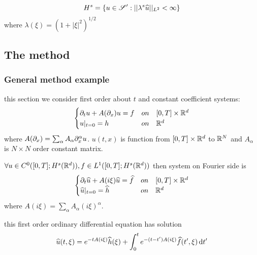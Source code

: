 \documentclass[../main]{subfiles}
\begin{document}
\begin{defn}
    \begin{equation}
        H^s =\{u\in \mathscr{S}': ||\lambda^s \widehat{u}||_{L^2}<\infty \}
    \end{equation}
    where $\lambda(\xi)=(1+|\xi|^2)^{1/2}$
\end{defn}

\subsection{The method}

\subsubsection{General method example}
this section we consider first order about $t$ and constant coefficient systems:
\begin{align}
    \begin{cases}
        \partial_t u+A(\partial_x)u=f & on\quad [0,T]\times \mathbb{R}^d\\
        u|_{t=0}=h & on\quad \mathbb{R}^d
    \end{cases}
\end{align}
where $A(\partial_x)=\sum_\alpha A_\alpha\partial_x^\alpha u$. $u(t,x)$ is function from $[0,T]\times \mathbb{R}^d$ to $\mathbb{R}^N$ and $A_\alpha$ is $N\times N$ order constant matrix.


\begin{thm}\label{thm-general}
    $\forall u\in C^0([0,T];H^s(\mathbb{R}^d)),f\in L^1([0,T];H^s(\mathbb{R}^d))$ then system on Fourier side is 
    \begin{align}
        \begin{cases}
            \partial_t \widehat{u}+A(i\xi)\widehat{u}=\widehat{f} & on\quad [0,T]\times \mathbb{R}^d\\
            \widehat{u}|_{t=0}=\widehat{h} & on\quad \mathbb{R}^d
        \end{cases}
    \end{align}
    where $A(i\xi)=\sum_\alpha A_\alpha(i\xi)^\alpha$.

    this first order ordinary differential equation has solution
    \begin{equation}\label{eq-general}
        \widehat{u}(t,\xi)=e^{-t A(i\xi)}\widehat{h}(\xi)+\int_0^t e^{-(t-t')A(i\xi)}\widehat{f}(t',\xi)\,\mathrm{d}t'
    \end{equation}
\end{thm}

\newpage
\end{document}
